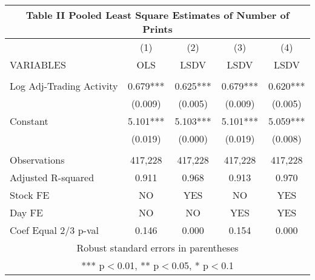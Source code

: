 \documentclass[]{article}
\begin{document}
\begin{tabular}{lcccc}
\multicolumn{5}{c}{Table II Pooled Least Square Estimates of Number of Prints} \\ \hline
 & (1) & (2) & (3) & (4) \\
VARIABLES & OLS & LSDV & LSDV & LSDV \\ \hline
 &  &  &  &  \\
Log Adj-Trading Activity & 0.679*** & 0.625*** & 0.679*** & 0.620*** \\
 & (0.009) & (0.005) & (0.009) & (0.005) \\
Constant & 5.101*** & 5.103*** & 5.101*** & 5.059*** \\
 & (0.019) & (0.000) & (0.019) & (0.008) \\
 &  &  &  &  \\
Observations & 417,228 & 417,228 & 417,228 & 417,228 \\
Adjusted R-squared & 0.911 & 0.968 & 0.913 & 0.970 \\
Stock FE & NO & YES & NO & YES \\
Day FE & NO & NO & YES & YES \\
 Coef Equal 2/3 p-val & 0.146 & 0.000 & 0.154 & 0.000 \\ \hline
\multicolumn{5}{c}{ Robust standard errors in parentheses} \\
\multicolumn{5}{c}{ *** p$<$0.01, ** p$<$0.05, * p$<$0.1} \\
\end{tabular}
\end{document}
